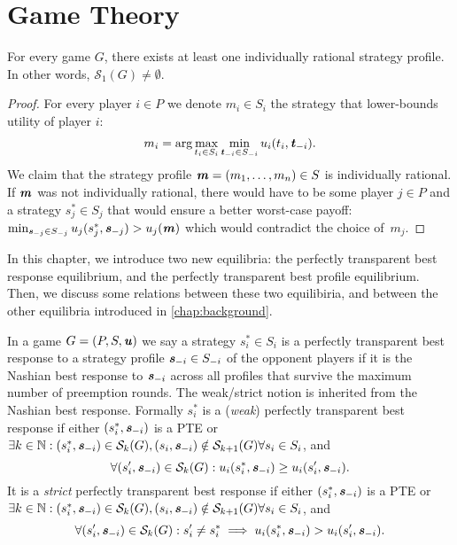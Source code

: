 \chapter{Game Theory}
\label{chap:game-theory}

\begin{lemma}
	For every game $G$, there exists at least one individually rational strategy profile.
	In other words, $\mathcal{S}_1(G) \ne \emptyset$.
\end{lemma}

\begin{proof}
	For every player $i \in P$ we denote $m_i \in S_i$ the strategy that lower-bounds utility of player $i$:
	\[
		m_i = \text{arg} \max_{t_i \in S_i} \min_{\boldsymbol{\mathit{t}}_{-i} \in S_{-i}} u_i(t_i, \boldsymbol{\mathit{t}}_{-i}).
	\]
	We claim that the strategy profile $\boldsymbol{\mathit{m}} = (m_1, \dots, m_n) \in S$ is individually rational.
	If $\boldsymbol{\mathit{m}}$ was not individually rational, there would have to be some player $j \in P$ and a strategy $s_j^* \in S_j$ that would ensure a better worst-case payoff: $\min_{\boldsymbol{\mathit{s}}_{-j} \in S_{-j}}u_j(s_j^*, \boldsymbol{\mathit{s}}_{-j}) > u_j(\boldsymbol{\mathit{m}})$ which would contradict the choice of~$m_j$.
\end{proof}

In this chapter, we introduce two new equilibria: the perfectly transparent best response equilibrium, and the perfectly transparent best profile equilibrium.
Then, we discuss some relations between these two equilibiria, and between the other equilibria introduced in \autoref{chap:background}.

\begin{definition}
	In a game $G = (P, S, \boldsymbol{\mathit{u}})$ we say a strategy $s_i^* \in S_i$ is a perfectly transparent best response to a strategy profile $\boldsymbol{\mathit{s}}_{-i} \in S_{-i}$ of the opponent players if it is the Nashian best response to $\boldsymbol{\mathit{s}}_{-i}$ across all profiles that survive the maximum number of preemption rounds.
	The weak/strict notion is inherited from the Nashian best response.
	Formally $s_i^*$ is a (\textit{weak}) perfectly transparent best response if either $(s_i^*, \boldsymbol{\mathit{s}}_{-i})$ is a PTE or $\exists k \in \mathbb{N}: (s_i^*, \boldsymbol{\mathit{s}}_{-i}) \in \mathcal{S}_k(G), (s_i, \boldsymbol{\mathit{s}}_{-i}) \notin \mathcal{S}_{k+1}(G) \forall s_i \in S_i$, and
	\[
		\forall (s_i', \boldsymbol{\mathit{s}}_{-i}) \in \mathcal{S}_k(G): u_i(s_i^*, \boldsymbol{\mathit{s}}_{-i}) \ge u_i(s_i', \boldsymbol{\mathit{s}}_{-i}).
	\]
	It is a \textit{strict} perfectly transparent best response if either $(s_i^*, \boldsymbol{\mathit{s}}_{-i})$ is a PTE or $\exists k \in \mathbb{N}: (s_i^*, \boldsymbol{\mathit{s}}_{-i}) \in \mathcal{S}_k(G), (s_i, \boldsymbol{\mathit{s}}_{-i}) \notin \mathcal{S}_{k+1}(G) \forall s_i \in S_i$, and
	\[
		\forall (s_i', \boldsymbol{\mathit{s}}_{-i}) \in \mathcal{S}_k(G): s_i' \ne s_i^* \implies u_i(s_i^*, \boldsymbol{\mathit{s}}_{-i}) > u_i(s_i', \boldsymbol{\mathit{s}}_{-i}).
	\]
\end{definition}

